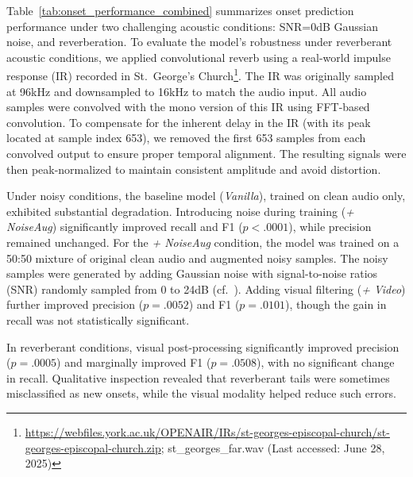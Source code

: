 \documentclass{article}
\begin{document}
Table~\ref{tab:onset_performance_combined} summarizes onset prediction performance under two challenging acoustic conditions: SNR=0\si{dB} Gaussian noise, and reverberation. To evaluate the model's robustness under reverberant acoustic conditions, we applied convolutional reverb using a real-world impulse response (IR) recorded in St.~George's Church\footnote{\href{https://webfiles.york.ac.uk/OPENAIR/IRs/st-georges-episcopal-church/st-georges-episcopal-church.zip}{https://webfiles.york.ac.uk/OPENAIR/IRs/st-georges-episcopal-church/st-georges-episcopal-church.zip}; st\_georges\_far.wav (Last accessed: June 28, 2025)}. The IR was originally sampled at 96\si{kHz} and downsampled to 16\si{kHz} to match the audio input. All audio samples were convolved with the mono version of this IR using FFT-based convolution. To compensate for the inherent delay in the IR (with its peak located at sample index 653), we removed the first 653 samples from each convolved output to ensure proper temporal alignment. The resulting signals were then peak-normalized to maintain consistent amplitude and avoid distortion.

Under noisy conditions, the baseline model (\textit{Vanilla}), trained on clean audio only, exhibited substantial degradation. Introducing noise during training (\textit{+ NoiseAug}) significantly improved recall and F1 ($p < .0001$), while precision remained unchanged. For the \textit{+ NoiseAug} condition, the model was trained on a 50:50 mixture of original clean audio and augmented noisy samples. The noisy samples were generated by adding Gaussian noise with signal-to-noise ratios (SNR) randomly sampled from 0 to 24\si{dB} (cf.~\cite{ISMIR24Kim}). Adding visual filtering (\textit{+ Video}) further improved precision ($p = .0052$) and F1 ($p = .0101$), though the gain in recall was not statistically significant.

In reverberant conditions, visual post-processing significantly improved precision ($p = .0005$) and marginally improved F1 ($p = .0508$), with no significant change in recall. Qualitative inspection revealed that reverberant tails were sometimes misclassified as new onsets, while the visual modality helped reduce such errors.

 
\end{document}
